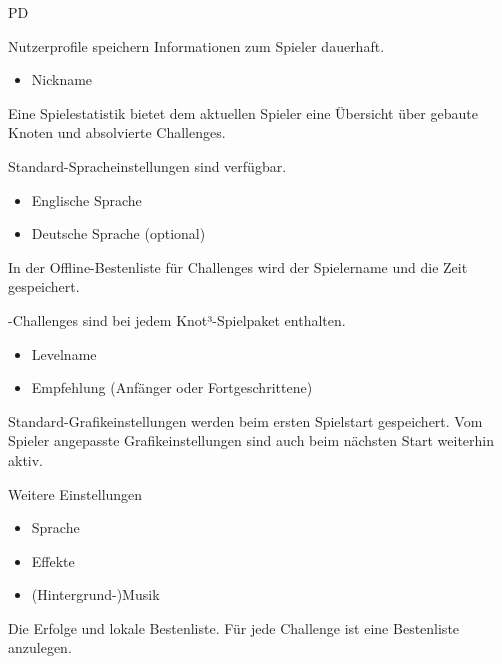 \begin{ids}{\gls{PD}}

	\id[10] Nutzerprofile speichern Informationen zum Spieler dauerhaft. 
	  \begin{itemize}
         \item Nickname
      \end{itemize}
      
     \id[20] Eine Spielestatistik bietet dem aktuellen Spieler eine Übersicht über gebaute Knoten und absolvierte Challenges.
     
     \id[30] Standard-Spracheinstellungen sind verfügbar.
     \begin{itemize}
       \item Englische Sprache
       \item Deutsche Sprache (optional)
     \end{itemize}
     
	 \id[40] In der Offline-Bestenliste für Challenges wird der Spielername und die Zeit gespeichert.

	-Challenges sind bei jedem Knot³-Spielpaket enthalten.
      \begin{itemize}
      \item Levelname
      \item Empfehlung (Anfänger oder      Fortgeschrittene)
      \end{itemize}

	 \id[50] Standard-Grafikeinstellungen werden beim ersten Spielstart gespeichert. Vom Spieler angepasste Grafikeinstellungen sind auch beim nächsten Start weiterhin aktiv.
	 
	 \id[60] Weitere Einstellungen
	 \begin{itemize}
     \item Sprache
     \item Effekte
     \item (Hintergrund-)Musik
     \end{itemize}
     
	 \id[70] Die Erfolge und lokale Bestenliste. Für jede Challenge ist eine Bestenliste anzulegen.
	 

\end{ids}
